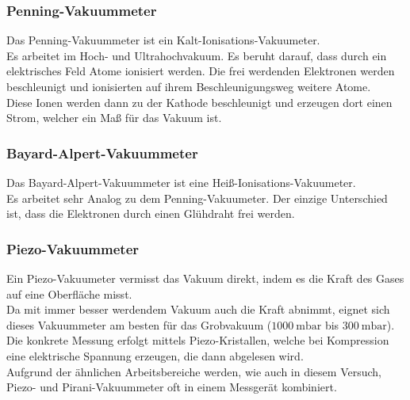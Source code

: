 		\subsubsection{Penning-Vakuummeter}

			\noindent
			Das Penning-Vakuummeter ist ein Kalt-Ionisations-Vakuumeter.\\
			 Es arbeitet im Hoch- und Ultrahochvakuum. 
			Es beruht darauf, dass durch ein elektrisches Feld Atome ionisiert werden.
			Die frei werdenden Elektronen werden beschleunigt und ionisierten auf ihrem Beschleunigungsweg weitere Atome.\\
			Diese Ionen werden dann zu der Kathode beschleunigt und erzeugen dort einen Strom, welcher ein Maß für das Vakuum ist.

		\subsubsection{Bayard-Alpert-Vakuummeter}

			\noindent
			Das Bayard-Alpert-Vakuummeter ist eine Heiß-Ionisations-Vakuumeter.\\ Es arbeitet sehr Analog zu dem Penning-Vakuumeter.
			Der einzige Unterschied ist, dass die Elektronen durch einen Glühdraht frei werden.
		
		\subsubsection{Piezo-Vakuummeter}
			
			\noindent
			Ein Piezo-Vakuumeter vermisst das Vakuum direkt, indem es die Kraft des Gases auf eine Oberfläche misst. \\
			Da mit immer besser werdendem Vakuum auch die Kraft abnimmt, eignet sich dieses Vakuummeter am besten für das Grobvakuum ($\SI{1000}{\milli\bar}$ bis $\SI{300}{\milli\bar}$).\\
			Die konkrete Messung erfolgt mittels Piezo-Kristallen, welche bei Kompression eine elektrische Spannung erzeugen, die dann abgelesen wird.\\
			Aufgrund der ähnlichen Arbeitsbereiche werden, wie auch in diesem Versuch, Piezo- und Pirani-Vakuummeter oft in einem Messgerät kombiniert.

			\newpage
